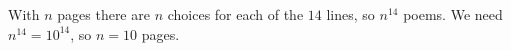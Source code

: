 With $n$ pages there are $n$ choices for each of the $14$ lines, so $n^{14}$ poems. We need $n^{14}=10^{14}$, so $n=\boxed{10}$ pages.
